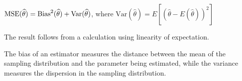 \begin{thm}\label{BiasVarianceDecomp}$\index{Estimator!variance of}\text{MSE}(\widehat{\theta}) = \text{Bias}^2(\widehat{\theta}) + \text{Var}(\widehat{\theta})$, where $\text{Var}(\widehat{\theta}) = E[(\widehat{\theta} - E(\widehat{\theta}))^2]$ 
\end{thm}
\begin{pf} The result follows from a calculation using linearity of expectation.
\end{pf}
\par
The bias of an estimator measures the distance between the mean of the sampling distribution and the parameter being estimated, while the variance measures the dispersion in the sampling distribution.

